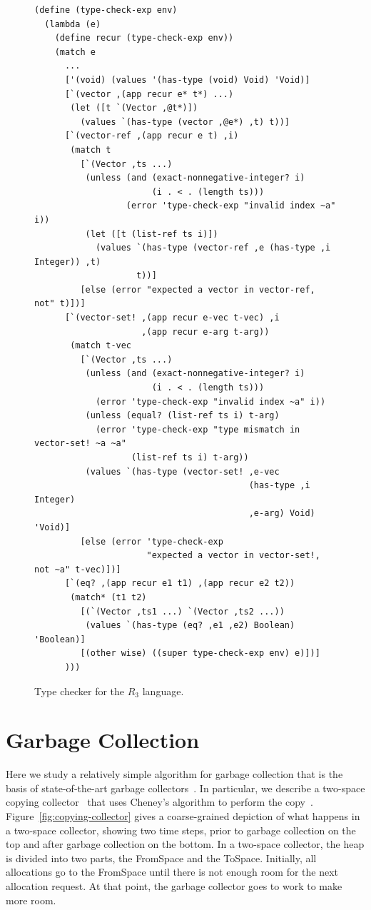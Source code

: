 \documentclass[11pt]{book}
\begin{document}
\begin{figure}[tbp]
\begin{lstlisting}
(define (type-check-exp env)
  (lambda (e)
    (define recur (type-check-exp env))
    (match e
      ...
      ['(void) (values '(has-type (void) Void) 'Void)]
      [`(vector ,(app recur e* t*) ...)
       (let ([t `(Vector ,@t*)])
         (values `(has-type (vector ,@e*) ,t) t))]
      [`(vector-ref ,(app recur e t) ,i)
       (match t
         [`(Vector ,ts ...)
          (unless (and (exact-nonnegative-integer? i)
                       (i . < . (length ts)))
                  (error 'type-check-exp "invalid index ~a" i))
          (let ([t (list-ref ts i)])
            (values `(has-type (vector-ref ,e (has-type ,i Integer)) ,t)
                    t))]
         [else (error "expected a vector in vector-ref, not" t)])]
      [`(vector-set! ,(app recur e-vec t-vec) ,i
                     ,(app recur e-arg t-arg))
       (match t-vec
         [`(Vector ,ts ...)
          (unless (and (exact-nonnegative-integer? i)
                       (i . < . (length ts)))
            (error 'type-check-exp "invalid index ~a" i))
          (unless (equal? (list-ref ts i) t-arg)
            (error 'type-check-exp "type mismatch in vector-set! ~a ~a"
                   (list-ref ts i) t-arg))
          (values `(has-type (vector-set! ,e-vec
                                          (has-type ,i Integer)
                                          ,e-arg) Void) 'Void)]
         [else (error 'type-check-exp
                      "expected a vector in vector-set!, not ~a" t-vec)])]
      [`(eq? ,(app recur e1 t1) ,(app recur e2 t2))
       (match* (t1 t2)
         [(`(Vector ,ts1 ...) `(Vector ,ts2 ...))
          (values `(has-type (eq? ,e1 ,e2) Boolean) 'Boolean)]
         [(other wise) ((super type-check-exp env) e)])]
      )))
\end{lstlisting}
\caption{Type checker for the $R_3$ language.}
\label{fig:typecheck-R3}
\end{figure}


\section{Garbage Collection}
\label{sec:GC}

Here we study a relatively simple algorithm for garbage collection
that is the basis of state-of-the-art garbage
collectors~\citep{Lieberman:1983aa,Ungar:1984aa,Jones:1996aa,Detlefs:2004aa,Dybvig:2006aa,Tene:2011kx}. In
particular, we describe a two-space copying
collector~\citep{Wilson:1992fk} that uses Cheney's algorithm to
perform the
copy~\citep{Cheney:1970aa}. Figure~\ref{fig:copying-collector} gives a
coarse-grained depiction of what happens in a two-space collector,
showing two time steps, prior to garbage collection on the top and
after garbage collection on the bottom. In a two-space collector, the
heap is divided into two parts, the FromSpace and the
ToSpace. Initially, all allocations go to the FromSpace until there is
not enough room for the next allocation request. At that point, the
garbage collector goes to work to make more room.
\end{document}
